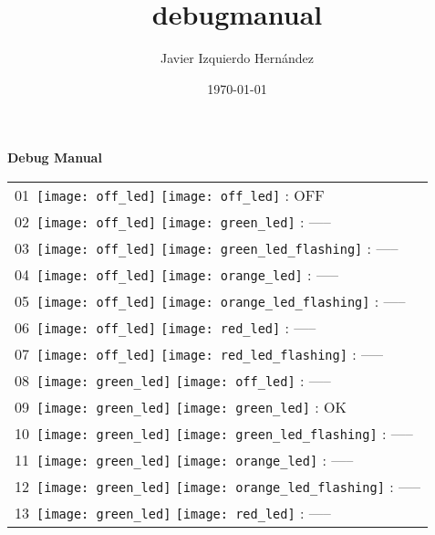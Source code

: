 \documentclass[12pt, a4paper]{report}
\title{debugmanual}
\author{Javier Izquierdo Hernández}
\date{\today}
\begin{document}
	\thispagestyle{empty}
	\centering
	{\bfseries\Huge Debug Manual \par}
	\vspace{1cm}
	\begin{minipage}{0.45\textwidth}
	\centering
	\begin{Large}
	
	\begin{tabular}{l}
		01\  \texttt{[image: off\_led]} \texttt{[image: off\_led]} : OFF\\
		
		02\  \texttt{[image: off\_led]} \texttt{[image: green\_led]} : -----\\
		
		03\  \texttt{[image: off\_led]} \texttt{[image: green\_led\_flashing]} : -----\\

		04\  \texttt{[image: off\_led]} \texttt{[image: orange\_led]} : -----\\
		
		05\  \texttt{[image: off\_led]} \texttt{[image: orange\_led\_flashing]} : -----\\
		
		06\  \texttt{[image: off\_led]} \texttt{[image: red\_led]} : -----\\
		
		07\  \texttt{[image: off\_led]} \texttt{[image: red\_led\_flashing]} : -----\\
		
		08\  \texttt{[image: green\_led]} \texttt{[image: off\_led]} : -----\\
		
		09\  \texttt{[image: green\_led]} \texttt{[image: green\_led]} : OK\\
		
		10\  \texttt{[image: green\_led]} \texttt{[image: green\_led\_flashing]} : -----\\
		
		11\  \texttt{[image: green\_led]} \texttt{[image: orange\_led]} : -----\\
		
		12\  \texttt{[image: green\_led]} \texttt{[image: orange\_led\_flashing]} : -----\\
		
		13\  \texttt{[image: green\_led]} \texttt{[image: red\_led]} : -----\\
		

\end{tabular}
\end{Large}
\end{minipage}
\end{document}
